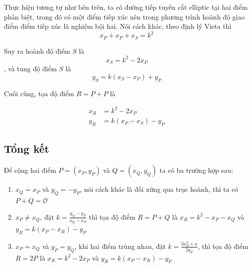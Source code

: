 Thực hiện tương tự như bên trên, ta có đường tiếp tuyến
cắt elliptic tại hai điểm phân biệt, trong đó có một điểm
tiếp xúc nên trong phương trình hoành độ giao điểm điểm
tiếp xúc là nghiệm bội hai. Nói cách khác, theo định lý
Vieta thì
\begin{equation*}
    x_P + x_P + x_S = k^2
\end{equation*}

Suy ra hoành độ điểm $S$ là 
\begin{equation}
    x_S = k^2 - 2 x_P
\end{equation}
, và tung độ điểm $S$ là
\begin{equation}
    y_S = k(x_S - x_P) + y_P
\end{equation}

Cuối cùng, tọa độ điểm $R = P + P$ là

\begin{align*}
    x_R & = k^2 - 2 x_P \\
    y_R & = k(x_P - x_S) - y_P
\end{align*}

\subsection*{Tổng kết}

Để cộng hai điểm $P=(x_P, y_P)$ và $Q = (x_Q, y_Q)$ ta có ba trường
hợp sau:

\begin{enumerate}
    \item $x_Q = x_P$ và $y_Q = -y_P$, nói cách khác là đối xứng qua
    trục hoành, thì ta có $P + Q = \mathcal{O}$
    \item $x_P \neq x_Q$, đặt $k = \frac{y_Q - y_P}{x_Q - x_P}$ thì
    tọa độ điểm $R = P + Q$ là $x_R = k^2 - x_P - x_Q$ và 
    $y_R = k(x_P - x_R) - y_P$
    \item $x_P = x_Q$ và $y_P = y_Q$, khi hai điểm trùng nhau, đặt
    $k = \frac{3x_P^2 + a}{2y_P}$, thì tọa độ điểm $R = 2P$ là 
    $x_R = k^2 - 2x_P$ và $y_R = k(x_P - x_R) - y_P$
\end{enumerate}